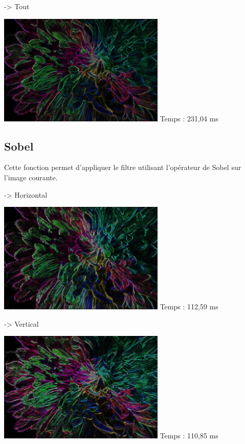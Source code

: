 \documentclass{article}
\begin{document}
-> Tout
\begin{center}
    \medbreak
    \includegraphics[width=300px]{./Images/Multicolor/Prewitt_All.jpg}
    \bigbreak
    Temps  : 231,04 ms
\end{center}
\bigbreak

\subsection{Sobel}
Cette fonction permet d'appliquer le filtre utilisant l'opérateur de Sobel sur l'image courante.
\medbreak

-> Horizontal
\begin{center}
    \medbreak
    \includegraphics[width=300px]{./Images/Multicolor/Sobel_Hor.jpg}
    \bigbreak
    Temps  : 112,59 ms
\end{center}
\medbreak

-> Vertical
\begin{center}
    \medbreak
    \includegraphics[width=300px]{./Images/Multicolor/Sobel_Ver.jpg}
    \bigbreak
    Temps  : 110,85 ms
\end{center}
\medbreak
\end{document}
